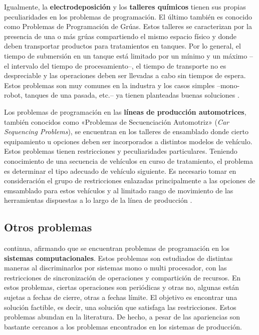 \documentclass[spanish,draft,12pt,headsepline,footsepline,paper=letter]{scrreprt}
\begin{document}
Igualmente, la \textbf{electrodeposición} y los \textbf{talleres químicos} tienen sus propias peculiaridades en los problemas de programación. El último también es conocido como Problemas de Programación de Grúas. Estos talleres se caracterizan por la presencia de una o más grúas compartiendo el mismo espacio físico y donde deben transportar productos para tratamientos en tanques. Por lo general, el tiempo de submersión en un tanque está limitado por un mínimo y un máximo –el intervalo del tiempo de procesamiento–, el tiempo de transporte no es despreciable y las operaciones deben ser llevadas a cabo sin tiempos de espera. Estos problemas son muy comunes en la industra y los casos simples –mono-robot, tanques de una pasada, etc.– ya tienen planteadas buenas soluciones \citep[p.~6,~7]{TKindt2002}.

Los problemas de programación en las \textbf{líneas de producción automotrices}, también conocidos como «Problemas de Secuenciación Automotriz» (\textit{Car Sequencing Problems}), se encuentran en los talleres de ensamblado donde cierto equipamiento u opciones deben ser incorporados a distintos modelos de vehículo. Estos problemas tienen restricciones y peculiaridades particulares. Teniendo conocimiento de una secuencia de vehículos en curso de tratamiento, el problema es determinar el tipo adecuado de vehículo siguiente. Es necesario tomar en consideración el grupo de restricciones enlazadas principalmente a las opciones de emsamblado para estos vehículos y al limitado rango de movimiento de las herramientas dispuestas a lo largo de la línea de producción \citep[p.~7]{TKindt2002}.

\subsection{Otros problemas}
\label{otros_problemas}

\citet[p.~7]{TKindt2002} continua, afirmando que se encuentran problemas de programación en los \textbf{sistemas computacionales}. Estos problemas son estudiados de distintas maneras al discriminarlos por sistemas mono o multi procesador, con las restricciones de sincronización de operaciones y compartición de recursos. En estos problemas, ciertas operaciones son periódicas y otras no, algunas están sujetas a fechas de cierre, otras a fechas límite. El objetivo es encontrar una solución factible, es decir, una solución que satisfaga las restricciones. Estos problemas abundan en la literatura. De hecho, a pesar de las apariencias son bastante cercanos a los problemas encontrados en los sistemas de producción.
\end{document}
